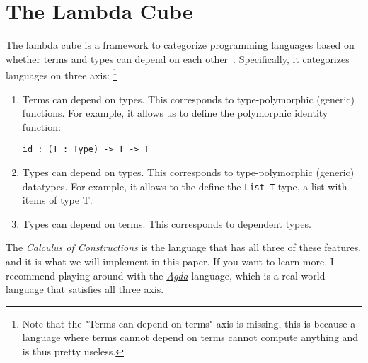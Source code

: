 \section{The Lambda Cube}

The lambda cube is a framework to categorize programming languages based on whether terms and types can depend on each other~\cite{lambda_cube}. Specifically, it categorizes languages on three axis: \footnote{Note that the "Terms can depend on terms" axis is missing, this is because a language where terms cannot depend on terms cannot compute anything and is thus pretty useless.}

\begin{enumerate}
	\item Terms can depend on types. This corresponds to type-polymorphic (generic) functions. For example, it allows us to define the polymorphic identity function:
	\begin{lstlisting}
id : (T : Type) -> T -> T
	\end{lstlisting}
	\item Types can depend on types. This corresponds to type-polymorphic (generic) datatypes. For example, it allows to the define the \verb|List T| type, a list with items of type T.
	
	\item Types can depend on terms. This corresponds to dependent types.
\end{enumerate}

The \textit{Calculus of Constructions} is the language that has all three of these features, and it is what we will implement in this paper. If you want to learn more, I recommend playing around with the \textit{\href{https://agda.readthedocs.io/en/latest/}{Agda}} language, which is a real-world language that satisfies all three axis.
